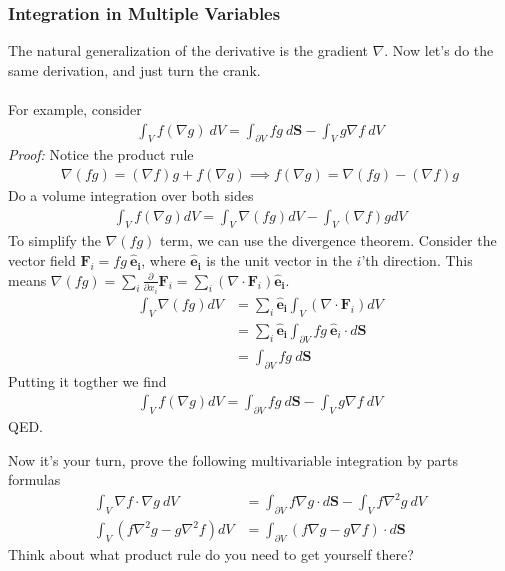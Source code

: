 \documentclass[12pt,fleqn]{article}
\numberwithin{equation}{section} %
\newcounter{problem}
\begin{document}
\subsubsection{Integration in Multiple Variables}
The natural generalization of the derivative is the gradient $\nabla$. Now let's do the same derivation, and just turn the crank. \\
\\
For example, consider
\begin{align}
	\int_V f (\nabla g) ~ dV = \int_{\partial V} fg \mathbf ~d\mathbf S - \int_V g \nabla f ~ dV
\end{align}
\emph{Proof:} Notice the product rule
\begin{align}
	\nabla(fg) = (\nabla f) g + f (\nabla g) \implies f(\nabla g) = \nabla(fg) - (\nabla f) g
\end{align}
Do a volume integration over both sides
\begin{align}
	\int_V f(\nabla g) dV = \int_V \nabla (fg) dV - \int_V (\nabla f) g dV
\end{align}
To simplify the $\nabla(fg)$ term, we can use the divergence theorem. Consider the vector field $\mathbf F_i = fg ~ \mathbf{\hat e_i}$, where $\mathbf{\hat e_i}$ is the unit vector in the $i$'th direction. This means $\nabla(fg) = \sum_i \frac{\partial}{\partial x_i} \mathbf F_i = \sum_i (\nabla \cdot \mathbf F_i) \mathbf{\hat e_i}$.\begin{align}
	\int_V \nabla (fg) dV & = \sum_i \mathbf{\hat e_i} \int_V (\nabla \cdot \mathbf F_i)  dV \\
	& =  \sum_i \mathbf{\hat e_i}\int_{\partial V} fg ~ \mathbf{\hat e}_i\cdot d \mathbf S\\
	&  = \int_{\partial V} fg~ d\mathbf S
\end{align}
Putting it togther we find
\begin{align}
	\int_V f(\nabla g) dV = \int_{\partial V} fg ~d\mathbf S - \int_V g\nabla f~ dV
\end{align}
QED.
\begin{problem}
	Now it's your turn, prove the following multivariable integration by parts formulas
	\begin{align}
		\int_V \nabla f \cdot \nabla g ~ dV & = \int_{\partial V} f\nabla g \cdot d \mathbf S - \int_V f\nabla^2 g ~ dV\\
		\int_V (f \nabla^2 g - g \nabla^2 f) dV& = \int_{\partial V} (f \nabla g - g \nabla f) \cdot d \mathbf S
	\end{align}
	Think about what product rule do you need to get yourself there?
\end{problem}
\newpage
\end{document}
